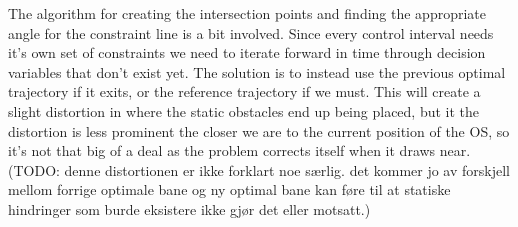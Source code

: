 The algorithm for creating the intersection points and finding the appropriate angle for the constraint line is a bit involved.
Since every control interval needs it's own set of constraints we need to iterate forward in time through decision variables
that don't exist yet. The solution is to instead use the previous optimal trajectory if it exits, or the reference trajectory if we must.
This will create a slight distortion in where the static obstacles end up being placed, but it the distortion is less prominent
the closer we are to the current position of the \gls{OS}, so it's not that big of a deal as the problem corrects itself when it draws near. (TODO: denne distortionen er ikke forklart noe særlig.
det kommer jo av forskjell mellom forrige optimale bane og ny optimal bane kan føre til at statiske hindringer som burde eksistere ikke gjør det eller motsatt.)

